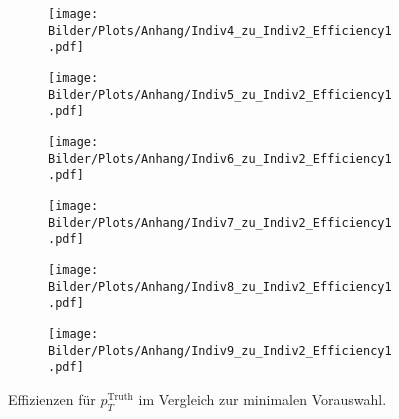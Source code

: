 \begin{figure}
  \begin{subfigure}[t]{0.5\textwidth}
  \texttt{[image: Bilder/Plots/Anhang/Indiv4\_zu\_Indiv2\_Efficiency1.pdf]}
  \end{subfigure}
\begin{subfigure}[t]{0.5\textwidth}
 \texttt{[image: Bilder/Plots/Anhang/Indiv5\_zu\_Indiv2\_Efficiency1.pdf]}
\end{subfigure}
\begin{subfigure}[t]{0.5\textwidth}
  \texttt{[image: Bilder/Plots/Anhang/Indiv6\_zu\_Indiv2\_Efficiency1.pdf]}
\end{subfigure}
\begin{subfigure}[t]{0.5\textwidth}
  \texttt{[image: Bilder/Plots/Anhang/Indiv7\_zu\_Indiv2\_Efficiency1.pdf]}
\end{subfigure}
\begin{subfigure}[t]{0.5\textwidth}
  \texttt{[image: Bilder/Plots/Anhang/Indiv8\_zu\_Indiv2\_Efficiency1.pdf]}
\end{subfigure}
\begin{subfigure}[t]{0.5\textwidth}
  \texttt{[image: Bilder/Plots/Anhang/Indiv9\_zu\_Indiv2\_Efficiency1.pdf]}
\end{subfigure}
\caption{Effizienzen für $p_T^{\text{Truth}}$ im Vergleich zur minimalen Vorauswahl.}
\end{figure}
\clearpage
\clearpage
